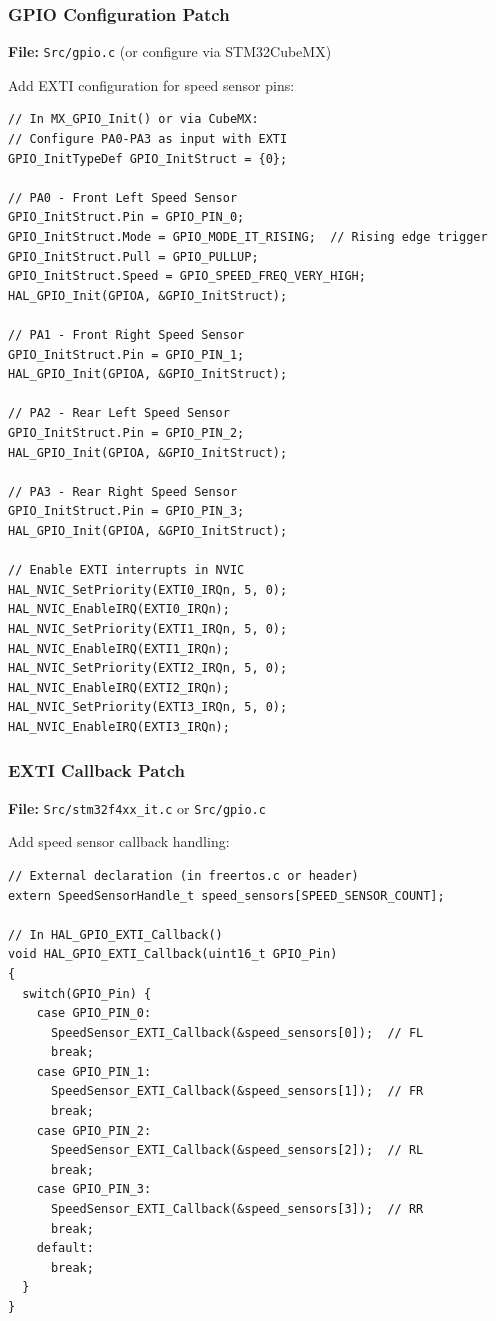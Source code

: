 \documentclass[11pt,a4paper]{article}
\begin{document}
\subsubsection{GPIO Configuration Patch}

\textbf{File:} \texttt{Src/gpio.c} (or configure via STM32CubeMX)

Add EXTI configuration for speed sensor pins:

\begin{lstlisting}[caption=GPIO EXTI Configuration, label=lst:gpioexti]
// In MX_GPIO_Init() or via CubeMX:
// Configure PA0-PA3 as input with EXTI
GPIO_InitTypeDef GPIO_InitStruct = {0};

// PA0 - Front Left Speed Sensor
GPIO_InitStruct.Pin = GPIO_PIN_0;
GPIO_InitStruct.Mode = GPIO_MODE_IT_RISING;  // Rising edge trigger
GPIO_InitStruct.Pull = GPIO_PULLUP;
GPIO_InitStruct.Speed = GPIO_SPEED_FREQ_VERY_HIGH;
HAL_GPIO_Init(GPIOA, &GPIO_InitStruct);

// PA1 - Front Right Speed Sensor
GPIO_InitStruct.Pin = GPIO_PIN_1;
HAL_GPIO_Init(GPIOA, &GPIO_InitStruct);

// PA2 - Rear Left Speed Sensor
GPIO_InitStruct.Pin = GPIO_PIN_2;
HAL_GPIO_Init(GPIOA, &GPIO_InitStruct);

// PA3 - Rear Right Speed Sensor
GPIO_InitStruct.Pin = GPIO_PIN_3;
HAL_GPIO_Init(GPIOA, &GPIO_InitStruct);

// Enable EXTI interrupts in NVIC
HAL_NVIC_SetPriority(EXTI0_IRQn, 5, 0);
HAL_NVIC_EnableIRQ(EXTI0_IRQn);
HAL_NVIC_SetPriority(EXTI1_IRQn, 5, 0);
HAL_NVIC_EnableIRQ(EXTI1_IRQn);
HAL_NVIC_SetPriority(EXTI2_IRQn, 5, 0);
HAL_NVIC_EnableIRQ(EXTI2_IRQn);
HAL_NVIC_SetPriority(EXTI3_IRQn, 5, 0);
HAL_NVIC_EnableIRQ(EXTI3_IRQn);
\end{lstlisting}

\subsubsection{EXTI Callback Patch}

\textbf{File:} \texttt{Src/stm32f4xx\_it.c} or \texttt{Src/gpio.c}

Add speed sensor callback handling:

\begin{lstlisting}[caption=EXTI Callback for Speed Sensors, label=lst:exticallback]
// External declaration (in freertos.c or header)
extern SpeedSensorHandle_t speed_sensors[SPEED_SENSOR_COUNT];

// In HAL_GPIO_EXTI_Callback()
void HAL_GPIO_EXTI_Callback(uint16_t GPIO_Pin)
{
  switch(GPIO_Pin) {
    case GPIO_PIN_0:
      SpeedSensor_EXTI_Callback(&speed_sensors[0]);  // FL
      break;
    case GPIO_PIN_1:
      SpeedSensor_EXTI_Callback(&speed_sensors[1]);  // FR
      break;
    case GPIO_PIN_2:
      SpeedSensor_EXTI_Callback(&speed_sensors[2]);  // RL
      break;
    case GPIO_PIN_3:
      SpeedSensor_EXTI_Callback(&speed_sensors[3]);  // RR
      break;
    default:
      break;
  }
}
\end{lstlisting}
\end{document}
